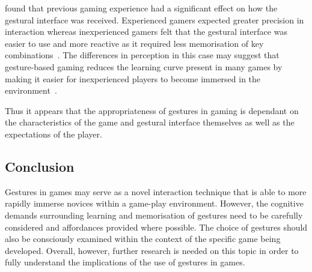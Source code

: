 \citet{Payn06} found that previous gaming experience had a significant effect on how the gestural interface was received. Experienced gamers expected greater precision in interaction whereas inexperienced gamers felt that the gestural interface was easier to use and more reactive as it required less memorisation of key combinations~\citep{Payn06}. The differences in perception in this case may suggest that gesture-based gaming reduces the learning curve present in many games by making it easier for inexperienced players to become immersed in the environment~\citep{Payn06}.

Thus it appears that the appropriateness of gestures in gaming is dependant on the characteristics of the game and gestural interface themselves as well as the expectations of the player.

\subsection{Conclusion}
Gestures in games may serve as a novel interaction technique that is able to more rapidly immerse novices within a game-play environment. However, the cognitive demands surrounding learning and memorisation of gestures need to be carefully considered and affordances provided where possible. The choice of gestures should also be consciously examined within the context of the specific game being developed. Overall, however, further research is needed on this topic in order to fully understand the implications of the use of gestures in games.
 
